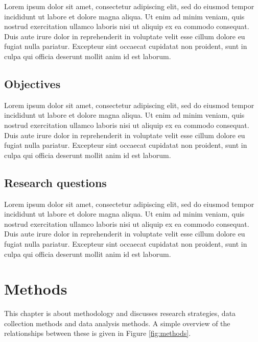 \documentclass[11pt]{report}
\begin{document}
Lorem ipsum dolor sit amet, consectetur adipiscing elit, sed do eiusmod tempor incididunt ut labore et dolore magna aliqua. Ut enim ad minim veniam, quis nostrud exercitation ullamco laboris nisi ut aliquip ex ea commodo consequat. Duis aute irure dolor in reprehenderit in voluptate velit esse cillum dolore eu fugiat nulla pariatur. Excepteur sint occaecat cupidatat non proident, sunt in culpa qui officia deserunt mollit anim id est laborum.

\section{Objectives}

Lorem ipsum dolor sit amet, consectetur adipiscing elit, sed do eiusmod tempor incididunt ut labore et dolore magna aliqua. Ut enim ad minim veniam, quis nostrud exercitation ullamco laboris nisi ut aliquip ex ea commodo consequat. Duis aute irure dolor in reprehenderit in voluptate velit esse cillum dolore eu fugiat nulla pariatur. Excepteur sint occaecat cupidatat non proident, sunt in culpa qui officia deserunt mollit anim id est laborum.

\section{Research questions}

Lorem ipsum dolor sit amet, consectetur adipiscing elit, sed do eiusmod tempor incididunt ut labore et dolore magna aliqua. Ut enim ad minim veniam, quis nostrud exercitation ullamco laboris nisi ut aliquip ex ea commodo consequat. Duis aute irure dolor in reprehenderit in voluptate velit esse cillum dolore eu fugiat nulla pariatur. Excepteur sint occaecat cupidatat non proident, sunt in culpa qui officia deserunt mollit anim id est laborum.



\chapter{Methods}

This chapter is about methodology and discusses research strategies, data collection methods and data analysis methods. A simple overview of the relationships between these is given in Figure \ref{fig:methods}.
\end{document}
